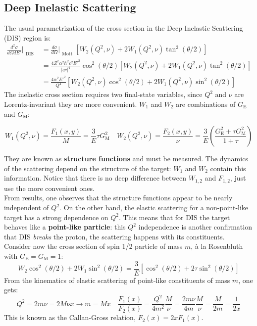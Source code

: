\documentclass[10.75pt,a4paper,openright,bottom=2cm]{article}
\newcommand{\beginbox}[1]{\begin{tcolorbox}[width=\textwidth,colback={yellow!50},title={#1},colbacktitle={gray!50},coltitle=black]}
\renewcommand{\endbox}{\end{tcolorbox}\noindent}
\begin{document}
\subsection{Deep Inelastic Scattering}
The usual parametrization of the cross section in the Deep Inelastic Scattering (DIS) region is:
\begin{align*}
\frac{d^2\sigma}{d\Omega dE'}\Bigr|_{\substack{\text{DIS}}}&=\frac{d\sigma}{d\Omega}\Bigr|_{\substack{\text{Mott}}}[W_2(Q^2,\nu)+2W_1(Q^2,\nu)\tan^2(\theta/2)]\\
&=\frac{4Z^2\alpha^2\hbar^2c^2E'^2}{|qc|^4}\cos^2(\theta/2)[W_2(Q^2,\nu)+2W_1(Q^2,\nu)\tan^2(\theta/2)]\\
&=\frac{4\alpha^2E'^2}{Q^4}[W_2(Q^2,\nu)\cos^2(\theta/2)+2W_1(Q^2,\nu)\sin^2(\theta/2)]
\end{align*}
The inelastic cross section requires two final-state variables, since $Q^2$ and $\nu$ are Lorentz-invariant they are more convenient. $W_1$ and $W_2$ are combinations of $G_{\text{E}}$ and $G_{\text{M}}$:
\beginbox{Lorentz Invariant Variables}
\[
W_1(Q^2,\nu)=\frac{F_1(x,y)}{M}=\frac{3}{E}\tau G^2_{\text{M}} \quad W_2(Q^2,\nu)=\frac{F_2(x,y)}{\nu}=\frac{3}{E}\left(\frac{G^2_{\text{E}}+\tau G_{\text{M}}^2}{1+\tau}\right)
\]
\endbox
They are known as \textbf{structure functions} and must be measured. The dynamics of the scattering depend on the structure of the target: $W_1$ and $W_2$ contain this information. Notice that there is no deep difference between $W_{1,2}$ and $F_{1,2}$, just use the more convenient ones.\\
From results, one observes that the structure functions appear to be nearly independent of $Q^2$. On the other hand, the elastic scattering for a non-point-like target has a strong dependence on $Q^2$. This means that for DIS the target behaves like a \textbf{point-like particle}: this $Q^2$ independence is another confirmation that DIS \textit{breaks} the proton, the scattering happens with its constituents.\\
Consider now the cross section of spin 1/2 particle of mass $m$, à la Rosenbluth with $G_{\text{E}}=G_{\text{M}}=1$:
\[
W_2\cos^2(\theta/2)+2W_1\sin^2(\theta/2)=\frac{3}{E}[\cos^2(\theta/2)+2\tau\sin^2(\theta/2)]
\]
From the kinematics of elastic scattering of point-like constituents of mass $m$, one gets:
\[
Q^2=2m\nu=2M\nu x\to m=Mx \quad \frac{F_1(x)}{F_2(x)}=\frac{Q^2}{4m^2}\frac{M}{\nu}=\frac{2m\nu}{4m}\frac{M}{\nu}=\frac{M}{2m}=\frac{1}{2x}
\]
This is known as the Callan-Gross relation, $F_2(x)=2xF_1(x)$.
\end{document}
